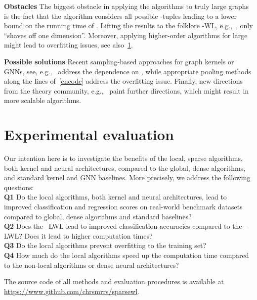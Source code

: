 \documentclass{article}
\newcommand{\xhdr}[1]{{\noindent\bfseries #1}}
\theoremstyle{definition}
\newcommand{\kwl}{-\textsf{WL}\xspace}
\newcommand{\localkwl}{--\textsf{LWL}\xspace}
\newcommand{\pluskwl}{--\textsf{LWL}\xspace}
\begin{document}
\xhdr{Obstacles} The biggest obstacle in applying the algorithms to truly large graphs is the fact that the algorithm considers all possible -tuples leading to a lower bound on the running time of . Lifting the results to the folklore \kwl, e.g.,~\cite{Mar+2019}, only ``shaves off one dimension''. Moreover, applying higher-order algorithms for large  might lead to overfitting issues, see also~\cref{exp}. 

\xhdr{Possible solutions} Recent sampling-based approaches for graph kernels or GNNs, see, e.g.,~\cite{Che+2018,Che+2018a,Ham+2017,Hua+2018,Mor+2017} address the dependence on , while appropriate pooling methods along the lines of~\cref{encode} address the overfitting issue. Finally, new directions from the theory community, e.g.,~\cite{Gro+2020a} paint further directions, which might result in more scalable algorithms.


\section{Experimental evaluation}\label{exp}

Our intention here is to investigate the benefits of the local, sparse algorithms, both kernel and neural architectures, compared to the global, dense algorithms, and standard kernel and GNN baselines.
More precisely, we address the following questions:\\
\xhdr{Q1} Do the local algorithms, both kernel and neural architectures, lead to improved classification and regression scores on real-world benchmark datasets compared to global, dense algorithms and standard baselines? \\
\xhdr{Q2}  Does the \pluskwl lead to improved classification accuracies compared to the  \localkwl? Does it lead to higher computation times?\\
\xhdr{Q3}  Do the local algorithms prevent overfitting to the training set?\\
\xhdr{Q4} How much do the local algorithms speed up the computation time compared to the non-local algorithms or dense neural architectures?

The source code of all methods and evaluation procedures is available at \url{https://www.github.com/chrsmrrs/sparsewl}. 
\end{document}
